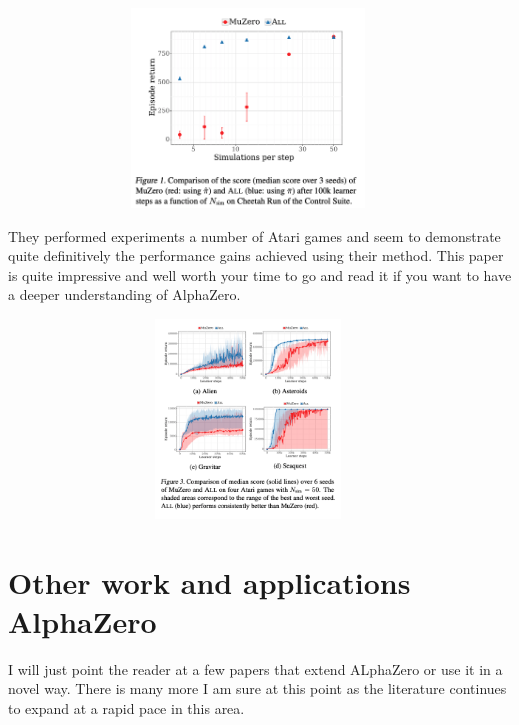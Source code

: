\begin{figure}[H]
       \centering
       \includegraphics[width=400px,height=200px]{experiments/mcts_reg_figure_1.png}
       \label{fig:my_label}
\end{figure}

They performed experiments a number of Atari games and seem to demonstrate quite definitively the performance gains achieved using their method. This paper is quite impressive and well worth your time to go and read it if you want to have a deeper understanding of AlphaZero.  


\begin{figure}[H]
       \centering
       \includegraphics[width=400px,height=200px]{experiments/mcts_reg_figure_3.png}
       \label{fig:my_label}
\end{figure}

\section{Other work and applications AlphaZero}

I will just point the reader at a few papers that extend ALphaZero or use it in a novel way. There is many more I am sure at this point as the literature continues to expand at a rapid pace in this area. 

